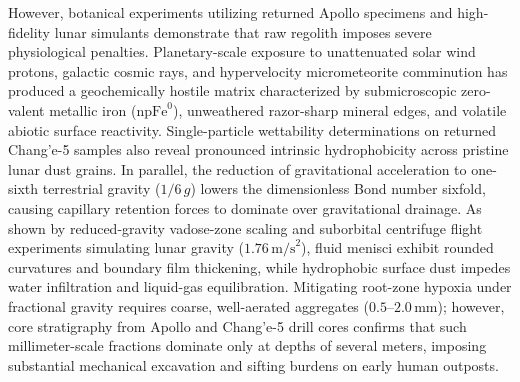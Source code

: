 However, botanical experiments utilizing returned Apollo specimens and high-fidelity lunar simulants demonstrate that raw regolith imposes severe physiological penalties\cite{paul2022plants,ming1989lunar,coker2026lunar}. Planetary-scale exposure to unattenuated solar wind protons, galactic cosmic rays, and hypervelocity micrometeorite comminution has produced a geochemically hostile matrix characterized by submicroscopic zero-valent metallic iron ($\mathrm{npFe}^0$), unweathered razor-sharp mineral edges, and volatile abiotic surface reactivity\cite{paul2022plants,ming1989lunar,hendrix2024reactivity,turci2015mechanistic}. Single-particle wettability determinations on returned Chang'e-5 samples also reveal pronounced intrinsic hydrophobicity across pristine lunar dust grains\cite{zhang2025wettability}. In parallel, the reduction of gravitational acceleration to one-sixth terrestrial gravity ($1/6\,g$) lowers the dimensionless Bond number sixfold, causing capillary retention forces to dominate over gravitational drainage\cite{ming1989lunar,steinberg2007fluid,jones1999microgravity,jones2012beyond}. As shown by reduced-gravity vadose-zone scaling\cite{jones2012beyond} and suborbital centrifuge flight experiments simulating lunar gravity ($1.76\,\mathrm{m/s}^2$), fluid menisci exhibit rounded curvatures and boundary film thickening, while hydrophobic surface dust impedes water infiltration and liquid-gas equilibration\cite{hasenstein2026assessing}. Mitigating root-zone hypoxia under fractional gravity requires coarse, well-aerated aggregates ($0.5\text{--}2.0\,\mathrm{mm}$)\cite{stout2001evidence,hasenstein2026assessing,jones2012beyond}; however, core stratigraphy from Apollo and Chang'e-5 drill cores confirms that such millimeter-scale fractions dominate only at depths of several meters\cite{mckay1991lunar,zhao2023variations}, imposing substantial mechanical excavation and sifting burdens on early human outposts.

